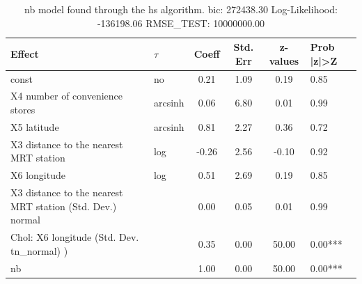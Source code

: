 \begin{table}
	\caption{nb model found through the hs algorithm. bic: 272438.30 Log-Likelihood: -136198.06 RMSE_TEST: 10000000.00}
	\begin{center}
		\begin{tabular}{|l|l|c|c|c|l|}
			\hline
			Effect & $\tau$ & Coeff & Std. Err & z-values & Prob |z|>Z \\
			\hline
			const & no & 0.21 & 1.09 & 0.19 & 0.85 \\
			\hline
			X4 number of convenience stores & arcsinh & 0.06 & 6.80 & 0.01 & 0.99 \\
			\hline
			X5 latitude & arcsinh & 0.81 & 2.27 & 0.36 & 0.72 \\
			\hline
			X3 distance to the nearest MRT station & log & -0.26 & 2.56 & -0.10 & 0.92 \\
			\hline
			X6 longitude & log & 0.51 & 2.69 & 0.19 & 0.85 \\
			\hline
			X3 distance to the nearest MRT station (Std. Dev.) normal &  & 0.00 & 0.05 & 0.01 & 0.99 \\
			\hline
			 Chol: X6 longitude (Std. Dev. tn_normal) ) &  & 0.35 & 0.00 & 50.00 & 0.00*** \\
			\hline
			nb &  & 1.00 & 0.00 & 50.00 & 0.00*** \\
			\hline
		\end{tabular}
	\end{center}
\end{table}